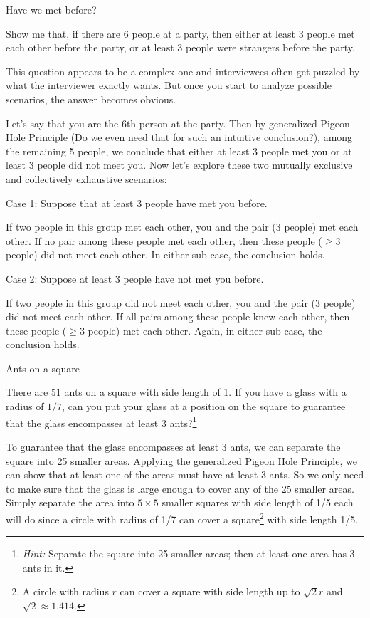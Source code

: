 \begin{problem}{Have we met before?}

Show me that, if there are 6 people at a party, then either at least 3 people met each other
before the party, or at least 3 people were strangers before the party.
\end{problem}

\begin{solution}
This question appears to be a complex one and interviewees often get puzzled by what the
interviewer exactly wants. But once you start to analyze possible scenarios, the answer
becomes obvious.

Let's say that you are the 6th person at the party. Then by generalized Pigeon Hole
Principle (Do we even need that for such an intuitive conclusion?), among the remaining
5 people, we conclude that either at least 3 people met you or at least 3 people did not
meet you. Now let's explore these two mutually exclusive and collectively exhaustive
scenarios:

Case 1: Suppose that at least 3 people have met you before.

If two people in this group met each other, you and the pair (3 people) met each other. If
no pair among these people met each other, then these people ($\geq 3$ people) did not meet
each other. In either sub-case, the conclusion holds.

Case 2: Suppose at least 3 people have not met you before.

If two people in this group did not meet each other, you and the pair (3 people) did not
meet each other. If all pairs among these people knew each other, then these people
($\geq 3$ people) met each other. Again, in either sub-case, the conclusion holds.
\end{solution}

\begin{problem}{Ants on a square}

There are 51 ants on a square with side length of 1. If you have a glass with a radius of
$1/7$, can you put your glass at a position on the square to guarantee that the glass
encompasses at least 3 ants?\footnote[11]{\emph{Hint:} Separate the square into 25 smaller areas; then at least one area has 3 ants in it.}
\end{problem}

\begin{solution}
To guarantee that the glass encompasses at least 3 ants, we can separate the square into
25 smaller areas. Applying the generalized Pigeon Hole Principle, we can show that at
least one of the areas must have at least 3 ants. So we only need to make sure that the
glass is large enough to cover any of the 25 smaller areas. Simply separate the area into
$5\times5$ smaller squares with side length of 1/5 each will do since a circle with radius
of 1/7 can cover a square\footnote[12]{A circle with radius $r$ can cover a square with side length up to $\sqrt{2}r$ and $\sqrt{2}\approx1.414$.} with side length 1/5.
\end{solution}

